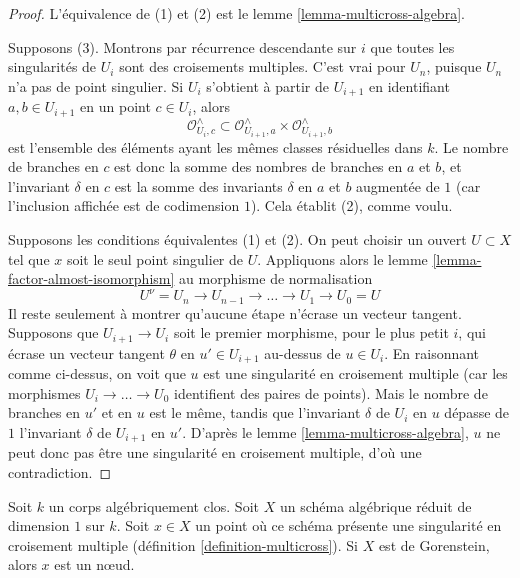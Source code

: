 \begin{proof}
L'équivalence de (1) et (2) est le lemme \ref{lemma-multicross-algebra}.

\medskip\noindent
Supposons (3). Montrons par récurrence descendante sur $i$ que toutes les singularités de $U_i$ sont des croisements multiples. C'est vrai pour $U_n$, puisque $U_n$ n'a pas de point singulier. Si $U_i$ s'obtient à partir de $U_{i + 1}$ en identifiant $a, b \in U_{i + 1}$ en un point $c \in U_i$, alors $$
\mathcal{O}_{U_i, c}^\wedge \subset
\mathcal{O}_{U_{i + 1}, a}^\wedge \times \mathcal{O}_{U_{i + 1}, b}^\wedge
$$ est l'ensemble des éléments ayant les mêmes classes résiduelles dans $k$. Le nombre de branches en $c$ est donc la somme des nombres de branches en $a$ et $b$, et l'invariant $\delta$ en $c$ est la somme des invariants $\delta$ en $a$ et $b$ augmentée de $1$ (car l'inclusion affichée est de codimension $1$). Cela établit (2), comme voulu.

\medskip\noindent
Supposons les conditions équivalentes (1) et (2). On peut choisir un ouvert $U \subset X$ tel que $x$ soit le seul point singulier de $U$. Appliquons alors le lemme \ref{lemma-factor-almost-isomorphism} au morphisme de normalisation $$
U^\nu = U_n \to U_{n - 1} \to \ldots \to U_1 \to U_0 = U
$$ Il reste seulement à montrer qu'aucune étape n'écrase un vecteur tangent. Supposons que $U_{i + 1} \to U_i$ soit le premier morphisme, pour le plus petit $i$, qui écrase un vecteur tangent $\theta$ en $u' \in U_{i + 1}$ au-dessus de $u \in U_i$. En raisonnant comme ci-dessus, on voit que $u$ est une singularité en croisement multiple (car les morphismes $U_i \to \ldots \to U_0$ identifient des paires de points). Mais le nombre de branches en $u'$ et en $u$ est le même, tandis que l'invariant $\delta$ de $U_i$ en $u$ dépasse de $1$ l'invariant $\delta$ de $U_{i + 1}$ en $u'$. D'après le lemme \ref{lemma-multicross-algebra}, $u$ ne peut donc pas être une singularité en croisement multiple, d'où une contradiction.
\end{proof}

\begin{lemma}
\label{lemma-multicross-gorenstein-is-nodal}
Soit $k$ un corps algébriquement clos. Soit $X$ un schéma algébrique réduit de dimension $1$ sur $k$. Soit $x \in X$ un point où ce schéma présente une singularité en croisement multiple (définition \ref{definition-multicross}). Si $X$ est de Gorenstein, alors $x$ est un nœud.
\end{lemma}

